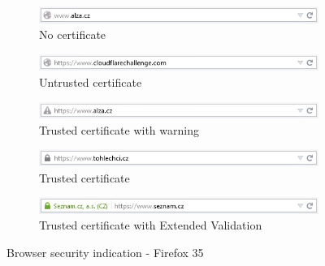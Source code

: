 \begin{figure}
  \begin{subfigure}[b]{\textwidth}
    \centering
    \includegraphics[scale=0.6]{images/browsers/ff-none.png}
    \caption{No certificate}
  \end{subfigure}
  \begin{subfigure}[b]{\textwidth}
    \centering
    \includegraphics[scale=0.6]{images/browsers/ff-untrusted.png}
    \caption{Untrusted certificate}
  \end{subfigure}
  \begin{subfigure}[b]{\textwidth}
    \centering
    \includegraphics[scale=0.6]{images/browsers/ff-warning.png}
    \caption{Trusted certificate with warning}
  \end{subfigure}
  \begin{subfigure}[b]{\textwidth}
    \centering
    \includegraphics[scale=0.6]{images/browsers/ff-dv.png}
    \caption{Trusted certificate}
  \end{subfigure}
  \begin{subfigure}[b]{\textwidth}
    \centering
    \includegraphics[scale=0.6]{images/browsers/ff-ev.png}
    \caption{Trusted certificate with Extended Validation}
  \end{subfigure}
  \caption{Browser security indication - Firefox 35}
\end{figure}

